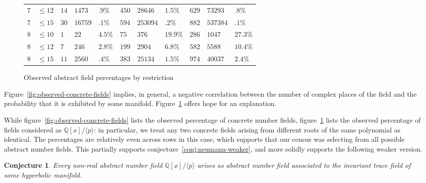 \documentclass[10pt]{amsart}
\newtheorem{conjecture}[theorem]{Conjecture}
\numberwithin{equation}{theorem}
\theoremstyle{definition}
\begin{document}
\begin{figure}[h]
{\begin{tabular}{|ll|lll|lll|lll|}
    $7$ & $\le 12$ & $14$ & $1473$ & $.9\%$ & $450$ & $28646$ & $1.5\%$ & $629$ & $73293$ & $.8\%$ \\
    $7$ & $\le 15$ & $30$ & $16759$ & $.1\%$ & $594$ & $253094$ & $.2\%$ & $882$ & $537384$ & $.1\%$ \\
    $8$ & $\le 10$ & $1$ & $22$ & $4.5\%$ & $75$ & $376$ & $19.9\%$ & $286$ & $1047$ & $27.3\%$ \\
    $8$ & $\le 12$ & $7$ & $246$ & $2.8\%$ & $199$ & $2904$ & $6.8\%$ & $582$ & $5588$ & $10.4\%$ \\
    $8$ & $\le 15$ & $11$ & $2560$ & $.4\%$ & $383$ & $25134$ & $1.5\%$ & $974$ & $40037$ & $2.4\%$ \\
    \hline
  \end{tabular}
  }
  \caption{Observed abstract field percentages by restriction}
  \label{fig:observed-abstract-fields}
\end{figure}

Figure~\ref{fig:observed-concrete-fields} implies, in general, a
negative correlation between the number of complex places of the
field and the probability that it is exhibited by some manifold.
Figure~\ref{fig:observed-abstract-fields} offers hope for an explanation.

While figure~\ref{fig:observed-concrete-fields}
lists the observed percentage of concrete number fields,
figure~\ref{fig:observed-abstract-fields} lists the observed percentage
of fields considered as $\mathbb{Q}[x]/\langle p \rangle$: in particular,
we treat any two concrete fields arising from different roots of the
same polynomial as identical. The percentages are relatively even
across rows in this case, which supports that our census was selecting
from all possible abstract number fields. This partially supports
conjecture~\ref{conj:neumann-weaker}, and more solidly supports the
following weaker version.

\begin{conjecture}
  \label{conj:only-abstract-represented}
  Every non-real abstract number field $\mathbb{Q}[x]/\langle p \rangle$
  arises as abstract number field associated to the invariant trace
  field of some hyperbolic manifold.
\end{conjecture}
\end{document}
